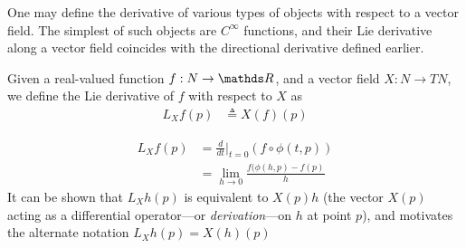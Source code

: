 

One may define the derivative of various types of objects with respect to a vector field. The simplest of such objects are $C^{\infty}$ functions, and their Lie derivative along a vector field coincides with the directional derivative defined earlier. 

\begin{defn}
Given a real-valued function $f: N \rightarrow \R$, and a vector field $X: N\rightarrow TN$, we define the Lie derivative of $f$ with respect to $X$ as
\begin{align}
L_Xf(p) &\triangleq {} X(f)(p) 
\end{align}
\end{defn}

\begin{equation}
\begin{aligned}
L_Xf(p) &={}\frac{d}{dt}\biggr|_{t=0}\left( f \circ \phi(t, p)  \right)\\
&={} \lim_{h\rightarrow 0}\frac{f(\phi(h, p)-f(p)}{h}
\end{aligned}
\end{equation}
It can be shown that $L_Xh(p)$ is equivalent to $X(p)h$ (the vector $X(p)$ acting as a differential operator---or \textit{derivation}---on $h$ at point $p$), and motivates the alternate notation $L_Xh(p) = X(h)(p)$


